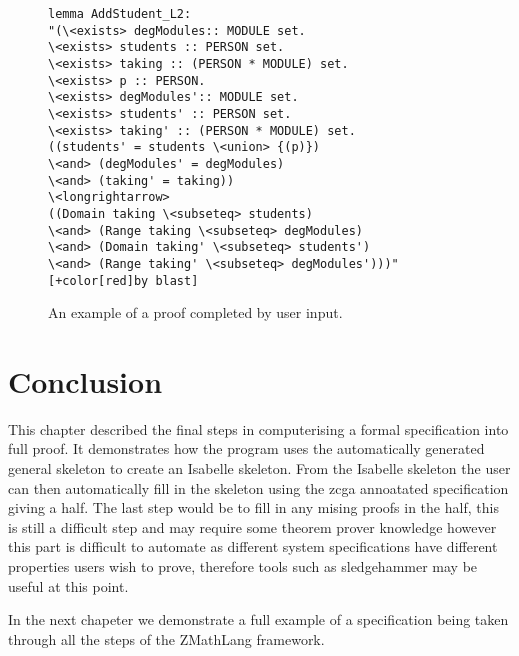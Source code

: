 \begin{center}
\begin{figure}[H]
\centering
\begin{footnotesize}
\begin{BVerbatim}[commandchars=+\[\]]
lemma AddStudent_L2:
"(\<exists> degModules:: MODULE set.
\<exists> students :: PERSON set.
\<exists> taking :: (PERSON * MODULE) set.
\<exists> p :: PERSON.
\<exists> degModules':: MODULE set.
\<exists> students' :: PERSON set.
\<exists> taking' :: (PERSON * MODULE) set.
((students' = students \<union> {(p)}) 
\<and> (degModules' = degModules) 
\<and> (taking' = taking))
\<longrightarrow>
((Domain taking \<subseteq> students)
\<and> (Range taking \<subseteq> degModules)
\<and> (Domain taking' \<subseteq> students')
\<and> (Range taking' \<subseteq> degModules')))"
[+color[red]by blast]
\end{BVerbatim}
\end{footnotesize}
\caption{\label{fig:exampleproof} An example of a proof completed by user input.}
\end{figure}
\end{center}

\section{Conclusion}

This chapter described the final steps in computerising a formal specification into full proof. It demonstrates how the program uses the automatically generated general skeleton to  create an Isabelle skeleton. From the Isabelle skeleton the user can then automatically fill in the skeleton using the \gls{zcga} annoatated specification giving a \gls{half}. The last step would be to fill in any mising proofs in the \gls{half}, this is still a difficult step and may require some theorem prover knowledge however this part is difficult to automate as different system specifications have different properties users wish to prove, therefore tools such as sledgehammer \cite{sledgehammer} may be useful at this point.

In the next chapeter we demonstrate a full example of a specification being taken through all the steps of the ZMathLang framework.